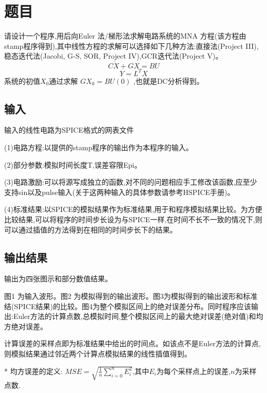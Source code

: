 \documentclass[12pt]{article}
\begin{document}
\begin{sloppypar}
\begin{titlepage}
\begin{center}
\end{center}
\end{titlepage}


\newpage
\tableofcontents
\newpage

\section{题目}
\qquad 请设计一个程序,用后向Euler 法/梯形法求解电路系统的MNA 方程(该方程由stamp程序得到),其中线性方程的求解可以选择如下几种方法:直接法(Project III),稳态迭代法(Jacobi, G-S, SOR, Project IV),GCR迭代法(Project V)。
\begin{equation}
\label{MNA}
C \dot{X}+G X=B U
\end{equation}
\begin{equation}
Y=L^T X 
\end{equation}
系统的初值$X_0$通过求解 $GX_0 = BU(0)$ ,也就是DC分析得到。

\subsection{输入}
\qquad 输入的线性电路为SPICE格式的网表文件 \par
\qquad (1)电路方程:以提供的stamp程序的输出作为本程序的输入。 \par
\qquad (2)部分参数:模拟时间长度T,误差容限Epi。 \par
\qquad (3)电路激励:可以将源写成独立的函数,对不同的问题相应手工修改该函数,应至少支持sin以及pulse输入(关于这两种输入的具体参数请参考HSPICE手册)。 \par
\qquad (4)标准结果:以SPICE的模拟结果作为标准结果,用于和程序模拟结果比较。为方便比较结果,可以将程序的时间步长设为与SPICE一样,在时间不长不一致的情况下,则可以通过插值的方法得到在相同的时间步长下的结果。 \par

\subsection{输出结果}
\qquad 输出为四张图示和部分数值结果。 \par
\qquad 图1 为输入波形。图2 为模拟得到的输出波形。图3为模拟得到的输出波形和标准结(SPICE结果)的比较。图4为整个模拟区间上的绝对误差分布。同时程序应该输出:Euler方法的计算点数,总模拟时间,整个模拟区间上的最大绝对误差(绝对值)和均方绝对误差。 \par
\qquad * 计算误差的采样点即为标准结果中给出的时间点。如该点不是Euler方法的计算点,则模拟结果通过邻近两个计算点模拟结果的线性插值得到。 \par
\qquad ** 均方误差的定义: $MSE=\sqrt{\frac{1}{n}\sum_{i=0}^{n}E_i^2}$,其中$E_i$为每个采样点上的误差,$n$为采样点数. \par


\end{sloppypar}
\end{document}
